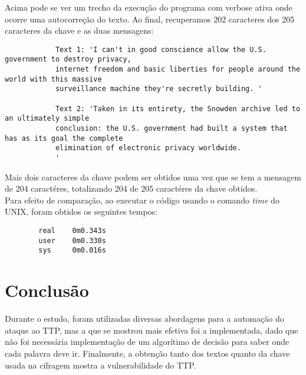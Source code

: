 \documentclass[10pt]{article}
\begin{document}
    	Acima pode se ver um trecho da execução do programa com verbose ativa onde ocorre uma autocorreção do texto. Ao final, recuperamos 202 caracteres dos 205 caracteres da chave e as duas mensagens: 

    	\begin{verbatim}
			Text 1: 'I can't in good conscience allow the U.S. government to destroy privacy, 
			internet freedom and basic liberties for people around the world with this massive 
			surveillance machine they're secretly building. '

			Text 2: 'Taken in its entirety, the Snowden archive led to an ultimately simple 
			conclusion: the U.S. government had built a system that has as its goal the complete 
			elimination of electronic privacy worldwide. 
			'
    	\end{verbatim}

    	Mais dois caracteres da chave podem ser obtidos uma vez que se tem a mensagem de 204 caractéres, totalizando 204 de 205 caractéres da chave obtidos.\\

    	Para efeito de comparação, ao executar o código usando o comando \textit{time} do UNIX, foram obtidos os seguintes tempos:

    	\begin{verbatim}
		real	0m0.343s
		user	0m0.330s
		sys		0m0.016s
    	\end{verbatim}

    	

    	\newpage

    \section{Conclusão}
    	Durante o estudo, foram utilizadas diversas abordagens para a automação do ataque ao TTP, mas a que se mostrou mais efetiva foi a implementada, dado que não foi necessária implementação de um algorítimo de decisão para saber onde cada palavra deve ir. Finalmente, a obtenção tanto dos textos quanto da chave usada na cifragem mostra a vulnerabilidade do TTP.	
\end{document}
